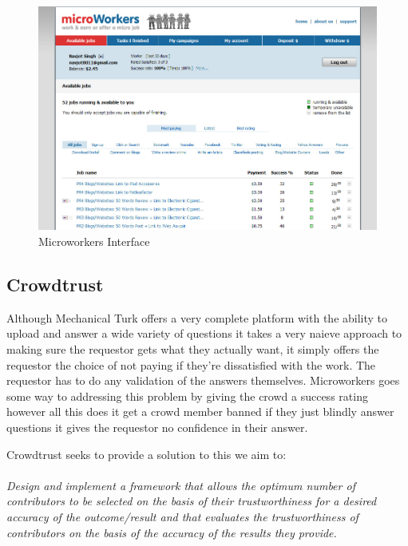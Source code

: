 \documentclass[11pt]{article}
\begin{document}
\begin{figure}[H]
\begin{center}
\includegraphics[width=\linewidth]{images/microworkersinterface.jpg}
\caption{Microworkers Interface}
\label{default}
\end{center}
\end{figure}


\subsection{Crowdtrust}
Although Mechanical Turk offers a very complete platform with the ability to upload and answer a wide variety of questions
it takes a very naieve approach to making sure the requestor gets what they actually want, it simply offers the requestor
the choice of not paying if they're dissatisfied with the work. The requestor has to do any validation of the answers themselves. 
Microworkers goes some way to addressing this problem by giving the crowd a success rating however all this does it get a crowd
member banned if they just blindly answer questions it gives the requestor no confidence in their answer.

Crowdtrust seeks to provide a solution to this we aim to:
\\
\\
\emph{Design and implement a framework that allows the optimum number of contributors to be selected on the basis of their trustworthiness 
for a desired accuracy of the outcome/result and that evaluates the trustworthiness of contributors on the basis of the accuracy of the 
results they provide.}
\end{document}

